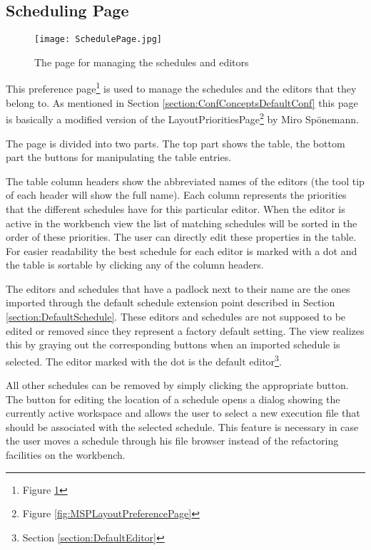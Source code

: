 \subsection{Scheduling Page}
\label{section:SchedulingPage}
\begin{figure}
  \centering
  \texttt{[image: SchedulePage.jpg]}
  \caption[The page for managing the schedules and editors]%
  {The page for managing the schedules and editors\protect}
  \label{fig:SchedulePage}
\end{figure}
This preference page\footnote{Figure \ref{fig:SchedulePage}} is used to manage the schedules and the editors that they belong to.
As mentioned in Section \ref{section:ConfConceptsDefaultConf} this page is basically a modified version 
of the LayoutPrioritiesPage\footnote{Figure \ref{fig:MSPLayoutPreferencePage}} by Miro Sp\"onemann.

The page is divided into two parts. The top part shows the table, the bottom part the buttons for manipulating
the table entries.

The table column headers show the abbreviated names of the editors (the tool tip of each header will show the full name). 
Each column represents the priorities that the different schedules have for this particular editor. When the editor is
active in the workbench view the list of matching schedules will be sorted in the order of these priorities. The user
can directly edit these properties in the table. For easier readability the best schedule for each editor is marked
with a dot and the table is sortable by clicking any of the column headers.

The editors and schedules that have a padlock next to their name are the ones imported through the default schedule 
extension point described in Section \ref{section:DefaultSchedule}. These editors and schedules are not supposed
to be edited or removed since they represent a factory default setting. The view realizes this by graying out the 
corresponding buttons when an imported schedule is selected. The editor marked with the dot is the default 
editor\footnote{Section \ref{section:DefaultEditor}}. 

All other schedules can be removed by simply clicking the appropriate button. The button for editing the location
of a schedule opens a dialog showing the currently active workspace and allows the user to select a new
execution file that should be associated with the selected schedule. This feature is necessary in case the user
moves a schedule through his file browser instead of the refactoring facilities on the workbench.


